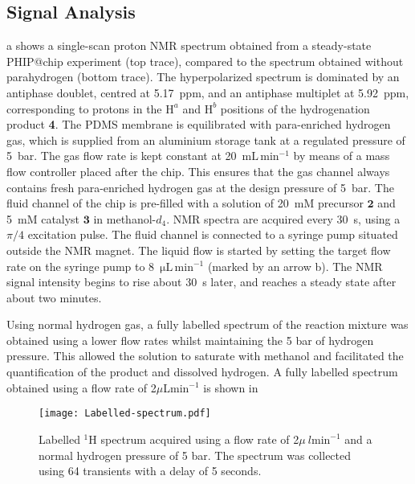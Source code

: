 \newpage

\subsection{Signal Analysis}

a shows a single-scan proton NMR spectrum
obtained from a steady-state PHIP@chip experiment (top trace), compared
to the spectrum obtained without parahydrogen (bottom trace).
The hyperpolarized spectrum is dominated by an antiphase doublet,
centred at 5.17~ppm, and an antiphase multiplet at 5.92~ppm, corresponding to
protons in the $\mathrm{H}^a$ and $\mathrm{H}^b$ positions of the
hydrogenation product \textbf{4}.
The PDMS membrane is equilibrated with para-enriched hydrogen gas, which is
supplied from an aluminium storage tank at a regulated pressure of 5~bar. The
gas flow rate is kept constant at 20~$\text{mL}\,\text{min}^{-1}$ by means of a
mass flow controller placed after the chip. This ensures that the gas channel
always contains fresh para-enriched hydrogen gas at the design pressure of
5~bar. The fluid channel of the chip is pre-filled with a solution of 20~mM
precursor $\mathbf{2}$ and 5~mM catalyst $\mathbf{3}$ in methanol-$d_4$. NMR
spectra are acquired every 30~s, using a $\pi/4$ excitation pulse.  The fluid
channel is connected to a syringe pump situated outside the NMR magnet.
The
liquid flow is started by setting the target flow rate on the syringe pump to
8~$\mathrm{\mu L\,\text{min}^{-1}}$ (marked by an arrow b).
The NMR signal intensity begins to rise about 30~s later, and reaches a steady
state after about two minutes.

Using normal hydrogen gas, a fully labelled spectrum of the reaction mixture
was obtained using a lower flow rates whilst maintaining
the 5 bar of hydrogen pressure. This allowed the solution to saturate with
methanol and facilitated the quantification of the product and dissolved hydrogen.
A fully labelled spectrum obtained using a flow rate of 2$\mu$L$\text{min}^{-1}$
is shown in 

\begin{figure}
  \begin{center}
  \texttt{[image: Labelled-spectrum.pdf]}
  \end{center}
  \caption{Labelled $^1$H spectrum acquired using a flow rate of 2$\mu~l \text{min}^{-1}$
  and a normal hydrogen pressure of 5 bar. The spectrum was collected using 64 transients
  with a delay of 5 seconds.}
  \label{fig:LabelledSpec}
\end{figure}

